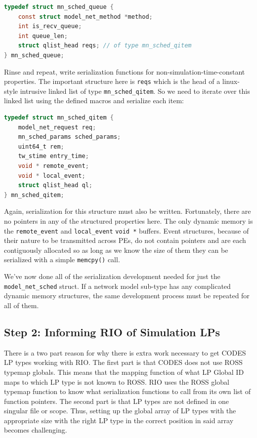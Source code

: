 \documentclass[letterpaper, 11 pt, conference]{IEEEtran}
\begin{document}
\begin{lstlisting}[language=C]
typedef struct mn_sched_queue {
	const struct model_net_method *method;
	int is_recv_queue;
	int queue_len;
	struct qlist_head reqs; // of type mn_sched_qitem
} mn_sched_queue;
\end{lstlisting}

Rinse and repeat, write serialization functions for non-simulation-time-constant properties. The important structure here is \texttt{reqs} which is the head of a linux-style intrusive linked list of type \texttt{mn\_sched\_qitem}. So we need to iterate over this linked list using the defined macros and serialize each item:

\begin{lstlisting}[language=C]
typedef struct mn_sched_qitem {
	model_net_request req;
	mn_sched_params sched_params;
	uint64_t rem;
	tw_stime entry_time;
	void * remote_event;
	void * local_event;
	struct qlist_head ql;
} mn_sched_qitem;
\end{lstlisting}

Again, serialization for this structure must also be written. Fortunately, there are no pointers in any of the structured properties here. The only dynamic memory is the \texttt{remote\_event} and \texttt{local\_event} \texttt{void *} buffers. Event structures, because of their nature to be transmitted across PEs, do not contain pointers and are each contiguously allocated so as long as we know the size of them they can be serialized with a simple \texttt{memcpy()} call. 

We've now done all of the serialization development needed for just the \texttt{model\_net\_sched} struct. If a network model sub-type has any complicated dynamic memory structures, the same development process must be repeated for all of them.


\subsection{Step 2: Informing RIO of Simulation LPs}
There is a two part reason for why there is extra work necessary to get CODES LP types working with RIO. The first part is that CODES does not use ROSS typemap globals. This means that the mapping function of what LP Global ID maps to which LP type is not known to ROSS. RIO uses the ROSS global typemap function to know what serialization functions to call from its own list of function pointers. The second part is that LP types are not defined in one singular file or scope. Thus, setting up the global array of LP types with the appropriate size with the right LP type in the correct position in said array becomes challenging.
\end{document}
